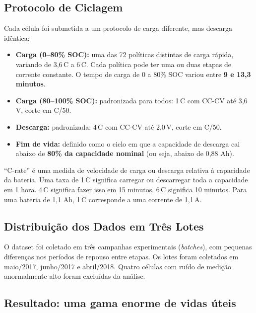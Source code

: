 \documentclass[12pt,a4paper]{article}
\begin{document}
\subsection{Protocolo de Ciclagem}

Cada c\'{e}lula foi submetida a um protocolo de carga diferente, mas descarga
id\^{e}ntica:

\begin{itemize}
  \item \textbf{Carga (0--80\% SOC):} uma das 72 pol\'{i}ticas distintas de carga r\'{a}pida,
    variando de 3,6\,C a 6\,C. Cada pol\'{i}tica pode ter uma ou duas etapas de
    corrente constante. O tempo de carga de 0 a 80\% SOC variou entre
    \textbf{9 e 13,3 minutos}.
  \item \textbf{Carga (80--100\% SOC):} padronizada para todos: 1\,C com CC-CV
    at\'{e} 3,6\,V, corte em C/50.
  \item \textbf{Descarga:} padronizada: 4\,C com CC-CV at\'{e} 2,0\,V, corte em
    C/50.
  \item \textbf{Fim de vida:} definido como o ciclo em que a capacidade de
    descarga cai abaixo de \textbf{80\% da capacidade nominal} (ou seja,
    abaixo de 0,88 Ah).
\end{itemize}

\begin{atencao}
``C-rate'' \'{e} uma medida de velocidade de carga ou descarga relativa \`{a}
capacidade da bateria. Uma taxa de 1\,C significa carregar ou descarregar
toda a capacidade em 1 hora. 4\,C significa fazer isso em 15 minutos.
6\,C significa 10 minutos. Para uma bateria de 1,1 Ah, 1\,C corresponde
a uma corrente de 1,1\,A.
\end{atencao}

\subsection{Distribui\c{c}\~ao dos Dados em Tr\^{e}s Lotes}

O dataset foi coletado em tr\^{e}s campanhas experimentais (\textit{batches}),
com pequenas diferen\c{c}as nos per\'{i}odos de repouso entre etapas. Os lotes foram
coletados em maio/2017, junho/2017 e abril/2018. Quatro c\'{e}lulas com ru\'{i}do
de medi\c{c}\~ao anormalmente alto foram exclu\'{i}das da an\'{a}lise.

\subsection{Resultado: uma gama enorme de vidas \'{u}teis}
\end{document}
